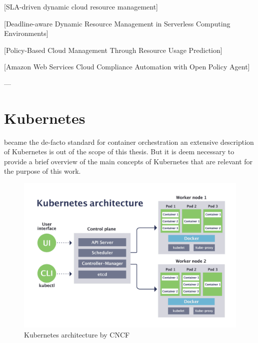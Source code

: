 [SLA-driven dynamic cloud resource management]

[Deadline-aware Dynamic Resource Management in Serverless Computing Environments]

[Policy-Based Cloud Management Through Resource Usage Prediction]

[Amazon Web Services Cloud Compliance Automation with Open Policy Agent]


---



\section{Kubernetes}

became the de-facto standard for container orchestration
an extensive description of Kubernetes is out of the scope of this thesis.
But it is deem necessary to provide a brief overview of the main concepts of Kubernetes that are relevant for the purpose of this work.

\begin{figure}[htb]
    \centering
    \includegraphics[width=1\linewidth]{images/kubernetes-architecture-diagram.png}
    \caption{Kubernetes architecture by CNCF \cite{kubernetes_cnfc}}
    \label{fig:kubernetes_architecture}
\end{figure}

